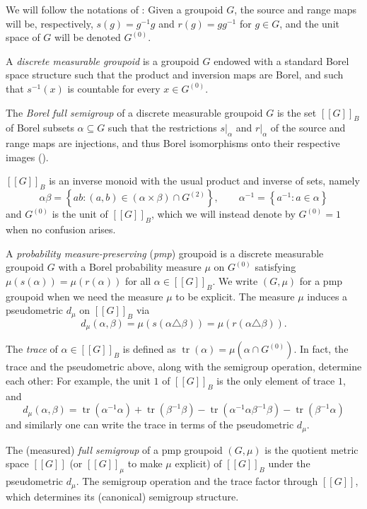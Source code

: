 \documentclass[11pt]{amsart}
\theoremstyle{plain}    \newtheorem{theorem}[generalnumbering]{Theorem}
\theoremstyle{plain}    \newtheorem{corollary}[generalnumbering]{Corollary}
\theoremstyle{definition}   \newtheorem{definition}[generalnumbering]{Definition}
\theoremstyle{definition}   \newtheorem{example}[generalnumbering]{Example}
\theoremstyle{plain}    \newtheorem{proposition}[generalnumbering]{Proposition}
\theoremstyle{plain}    \newtheorem{lemma}[generalnumbering]{Lemma}
\theoremstyle{plain}    \newtheorem{plainstyle}[generalnumbering]{\namefordifferentenvironment}
\theoremstyle{plain}    \newtheorem*{plainstyle*}{\namefordifferentenvironment}
\theoremstyle{definition}    \newtheorem{definitionstyle}[generalnumbering]{\namefordifferentenvironment}
\theoremstyle{definition}    \newtheorem*{definitionstyle*}{\namefordifferentenvironment}
\begin{document}
We will follow the notations of \cite{MR3130315}: Given a groupoid $G$, the source and range maps will be, respectively, $s(g)=g^{-1}g$ and $r(g)=gg^{-1}$ for $g\in G$, and the unit space of $G$ will be denoted $G^{(0)}$.

A \emph{discrete measurable groupoid} is a groupoid $G$ endowed with a standard Borel space structure such that the product and inversion maps are Borel, and such that $s^{-1}(x)$ is countable for every $x\in G^{(0)}$.

The \emph{Borel full semigroup} of a discrete measurable groupoid $G$ is the set $[[G]]_B$ of Borel subsets $\alpha\subseteq G$ such that the restrictions $s|_\alpha$ and $r|_\alpha$ of the source and range maps are injections, and thus Borel isomorphisms onto their respective images (\cite[Theorem 15.2]{MR1321597}).%

$[[G]]_B$ is an inverse monoid with the usual product and inverse of sets, namely
\[\alpha\beta=\left\{ab:(a,b)\in (\alpha\times\beta)\cap G^{(2)}\right\},\qquad \alpha^{-1}=\left\{a^{-1}:a\in\alpha\right\}\]
and $G^{(0)}$ is the unit of $[[G]]_B$, which we will instead denote by $G^{(0)}=1$ when no confusion arises.

A \emph{probability measure-preserving} (\emph{pmp}) groupoid is a discrete measurable groupoid $G$ with a Borel probability measure $\mu$ on $G^{(0)}$ satisfying $\mu(s(\alpha))=\mu(r(\alpha))$ for all $\alpha\in[[G]]_B$. We write $(G,\mu)$ for a pmp groupoid when we need the measure $\mu$ to be explicit. The measure $\mu$ induces a pseudometric $d_{\mu}$ on $[[G]]_B$ via
\[d_{\mu}(\alpha,\beta)=\mu(s(\alpha\triangle\beta))=\mu(r(\alpha\triangle\beta)).\]

The \emph{trace} of $\alpha\in[[G]]_B$ is defined as $\operatorname{tr}(\alpha)=\mu(\alpha\cap G^{(0)})$. In fact, the trace and the pseudometric above, along with the semigroup operation, determine each other: For example, the unit $1$ of $[[G]]_B$ is the only element of trace $1$, and
\[d_\mu(\alpha,\beta)=\operatorname{tr}(\alpha^{-1}\alpha)+\operatorname{tr}(\beta^{-1}\beta)-\operatorname{tr}(\alpha^{-1}\alpha\beta^{-1}\beta)-\operatorname{tr}(\beta^{-1}\alpha)\]
and similarly one can write the trace in terms of the pseudometric $d_\mu$.

The (measured) \emph{full semigroup} of a pmp groupoid $(G,\mu)$ is the quotient metric space $[[G]]$ (or $[[G]]_\mu$ to make $\mu$ explicit) of $[[G]]_B$ under the pseudometric $d_\mu$. The semigroup operation and the trace factor through $[[G]]$, which determines its (canonical) semigroup structure.
\end{document}
